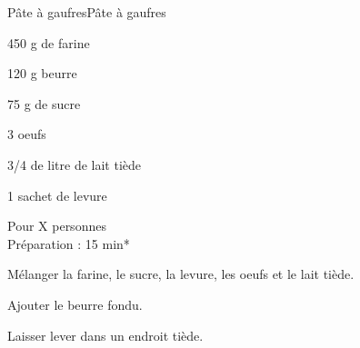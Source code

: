 \begin{recette}{Pâte à  gaufres}{Pâte à  gaufres}

\begin{ingredients}
450 g de farine\par
120 g beurre\par
75 g de sucre\par
3 oeufs\par
3/4 de litre de lait tiède\par
1 sachet de levure\par
\end{ingredients}

\begin{infos}
Pour X personnes\\
Préparation : 15 min*	\\
\end{infos}

\begin{etapes}
\item %
\item %
\item %
\item Mélanger la farine, le sucre, la levure, les oeufs et le lait tiède.
\item Ajouter le beurre fondu.
\item Laisser lever dans un endroit tiède.
\end{etapes}

\end{recette}